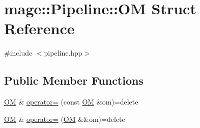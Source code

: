 \hypertarget{structmage_1_1_pipeline_1_1_o_m}{}\section{mage\+:\+:Pipeline\+:\+:OM Struct Reference}
\label{structmage_1_1_pipeline_1_1_o_m}


{\ttfamily \#include $<$pipeline.\+hpp$>$}

\subsection*{Public Member Functions}
\begin{DoxyCompactItemize}
\item 
\hyperlink{structmage_1_1_pipeline_1_1_o_m}{OM} \& \hyperlink{structmage_1_1_pipeline_1_1_o_m_a39f2cdea05eaa83bc351c3aa12c07741}{operator=} (const \hyperlink{structmage_1_1_pipeline_1_1_o_m}{OM} \&om)=delete
\item 
\hyperlink{structmage_1_1_pipeline_1_1_o_m}{OM} \& \hyperlink{structmage_1_1_pipeline_1_1_o_m_af65bb4fbcd0d5d49aae7354ec9104680}{operator=} (\hyperlink{structmage_1_1_pipeline_1_1_o_m}{OM} \&\&om)=delete
\end{DoxyCompactItemize}
